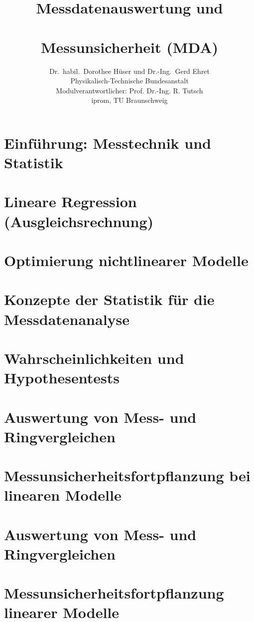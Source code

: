 \documentclass[a4paper,11pt]{book}
\title{\normalfont\sffamily\bfseries{\Huge{Messdatenauswertung und\\~\\ Messunsicherheit (MDA)}}}
\author{Dr.\ habil.\ Dorothee Hüser und Dr.-Ing.\ Gerd Ehret\\
Physikalisch-Technische Bundesanstalt\\
Modulverantwortlicher: Prof. Dr.-Ing. R. Tutsch\\
iprom, TU Braunschweig}
\begin{document}
\frontmatter                            %
\maketitle                              %
\tableofcontents                        %
\mainmatter                             %

\chapter{Einführung: Messtechnik und Statistik}

%
\chapter{Lineare Regression (Ausgleichsrechnung)}
\label{KapitellinReg}

%
\chapter{Optimierung nichtlinearer Modelle}

%
\chapter{Konzepte der Statistik für die Messdatenanalyse}

%
\chapter{Wahrscheinlichkeiten und Hypothesentests}

%
\chapter{Auswertung von Mess- und Ringvergleichen}
%
%
\chapter{Messunsicherheitsfortpflanzung bei linearen Modelle}
\label{unsicherheitsfortpfLin}
%
%
\chapter{Auswertung von Mess- und Ringvergleichen}
%
\chapter{Messunsicherheitsfortpflanzung\\ linearer Modelle}
%
\end{document}
